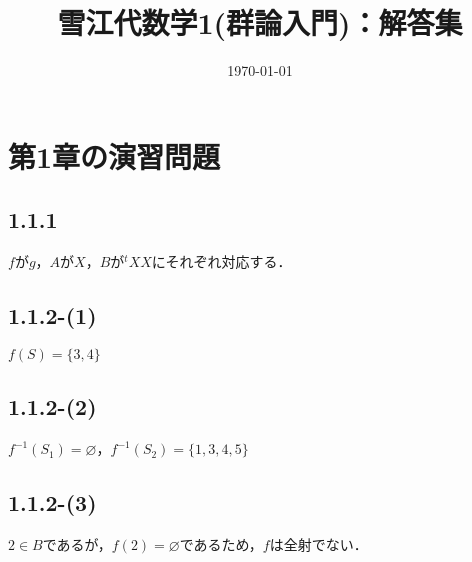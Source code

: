 \documentclass[uplatex,dvipdfmx,a4paper,11pt]{jsarticle}
\newenvironment{tleftbar}{\begin{tbleftline}\setlength{\parindent}{1zw}}{\end{tbleftline}}
\begin{document}
\title{雪江代数学1(群論入門)：解答集}
\author{}
\date{\today}
\maketitle
\begin{multicols*}{3}
    \tableofcontents
\end{multicols*}
\newpage

\section*{第1章の演習問題}

\subsection*{1.1.1}
\begin{tleftbar}
    $f$が$g$，$A$が$X$，$B$が${}^t X X$にそれぞれ対応する．
\end{tleftbar}

\subsection*{1.1.2-(1)}

\begin{tleftbar}
    $f(S)= \{ 3, 4 \}$
\end{tleftbar}

\subsection*{1.1.2-(2)}
\begin{tleftbar}
$f^{-1}(S_1)= \varnothing$，$f^{-1}(S_2)=\{ 1 , 3 , 4 , 5 \}$
\end{tleftbar}

\subsection*{1.1.2-(3)}
\begin{tleftbar}
$2 \in B$であるが，$f(2)= \varnothing$であるため，$f$は全射でない．
\end{tleftbar}
\end{document}

